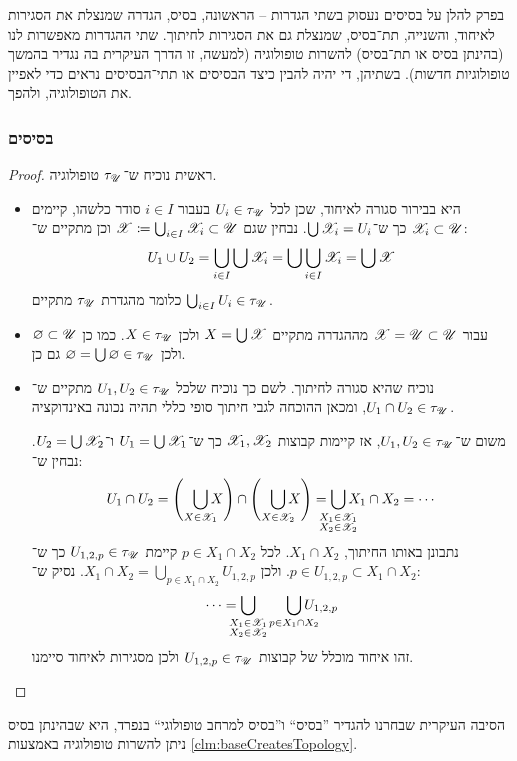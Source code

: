 \documentclass[name=רשימות טופולוגיה כללית]{../../../tex/classes/noChapterMegasumPreamble}
\begin{document}
	בפרק להלן על בסיסים נעסוק בשתי הגדרות – הראשונה, בסיס, הגדרה שמנצלת את הסגירות לאיחוד, והשנייה, תת‏־בסיס, שמנצלת גם את הסגירות לחיתוך. שתי ההגדרות מאפשרות לנו (בהינתן בסיס או תת־בסיס) להשרות טופולוגיה (למעשה, זו הדרך העיקרית בה נגדיר בהמשך טופולוגיות חדשות). בשתיהן, די יהיה להבין כיצד הבסיסים או תתי־הבסיסים נראים כדי לאפיין את הטופולוגיה, ולהפך. 
	\subsubsection{\label{sss:base}בסיסים}
	
	\begin{proof}
		ראשית נוכיח ש־$\tau_\mathscr{U}$ טופולוגיה. 
		\begin{itemize}
			\item היא בבירור סגורה לאיחוד, שכן לכל $U_i \in \tau_\mathscr{U}$ בעבור $i \in I$ סודר כלשהו, קיימים $\mathscr{X}_i \subset \mathscr{U}$ כך ש־$\bigcup \mathscr{X}_i = U_i$. נבחין שגם $\mathscr{X} \coloneqq \bigcup_{i \in I} \mathscr{X}_i \subset \mathscr{U}$ וכן מתקיים ש־: 
			\[ U_1 \cup U_2 = \bigcup_{i \in I}{\bigcup \mathscr{X}_i} = \bigcup\bigcup_{i \in I} \mathscr{X}_i = \bigcup \mathscr{X} \]
			כלומר מהגדרת $\tau_\mathscr{U}$ מתקיים $\bigcup_{i \in I}U_i \in \tau_\mathscr{U}$. 
			\item עבור $\mathscr{X} = \mathscr{U}\subset \mathscr{U}$ מההגדרה מתקיים $X = \bigcup \mathscr{X}$ ולכן $X \in \tau_\mathscr{U}$. כמו כן $\varnothing \subset \mathscr{U}$ ולכן $\varnothing = \bigcup \varnothing \in \tau_\mathscr{U}$ גם כן. 
			\item נוכיח שהיא סגורה לחיתוך. לשם כך נוכיח שלכל $U_1, U_2 \in \tau_\mathscr{U}$ מתקיים ש־$U_1 \cap U_2 \in\tau_\mathscr{U}$, ומכאן ההוכחה לגבי חיתוך סופי כללי תהיה נכונה באינדוקציה. 
			
			משום ש־$U_1, U_2 \in \tau_\mathscr{U}$, אז קיימות קבוצות $\mathscr{X}_1, \mathscr{X}_2$ כך ש־$U_1 = \bigcup \mathscr{X}_1$ ו־$U_2 = \bigcup \mathscr{X}_2$. נבחין ש־: 
			\[ U_1 \cap U_2 = \cl{\ \ \bigcup_{\mathclap{X \in \XX_1}} X} \cap \cl{\ \ \bigcup_{\mathclap{X \in \XX_2}} X} = \bigcup_{\mathclap{\substack{X_1 \in \XX_1\\ X_2 \in \XX_2}}}X_1 \cap X_2 = \cdots \]
			נתבונן באותו החיתוך, $X_1 \cap X_2$. לכל $p \in X_1 \cap X_2$ קיימת $U_{1, 2, p} \in \tau_\mathscr{U}$ כך ש־$p \in U_{1, 2, p} \subset X_1 \cap X_2$. ולכן $X_1 \cap X_2 = \bigcup_{p \in X_1 \cap X_2} U_{1, 2, p}$. נסיק ש־: 
			\[ \cdots = \bigcup_{\mathclap{\substack{X_1 \in \XX_1\\ X_2 \in \XX_2}}}\quad \quad\bigcup_{\mathclap{p \in X_1 \cap X_2}}U_{1, 2, p} \]
			זהו איחוד מוכלל של קבוצות $U_{1, 2, p} \in \tau_\mathscr{U}$ ולכן מסגירות לאיחוד סיימנו. 
		\end{itemize}\envendproof
	\end{proof}
	הסיבה העיקרית שבחרנו להגדיר ''בסיס`` ו''בסיס למרחב טופולוגי`` בנפרד, היא שבהינתן בסיס ניתן להשרות טופולוגיה באמצעות \ref{clm:baseCreatesTopology}. 
	
\end{document}

